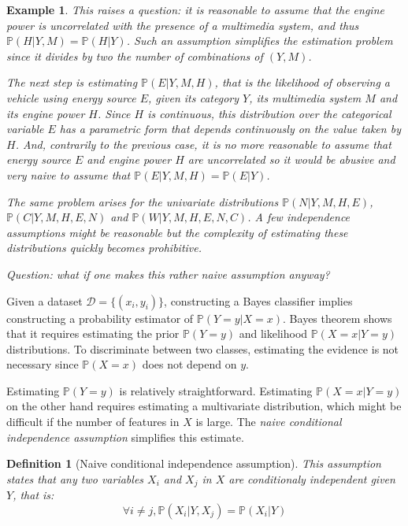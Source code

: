 \documentclass{article}
\newtheorem*{definition}{Definition}
\newtheorem*{example}{Example}
\begin{document}
\begin{example}
This raises a question: it is reasonable to assume that the engine power is uncorrelated with the presence of a multimedia system, and thus $\mathbb{P}(H|Y,M) = \mathbb{P}(H|Y)$. Such an assumption simplifies the estimation problem since it divides by two the number of combinations of $(Y,M)$.

The next step is estimating $\mathbb{P}(E|Y,M,H)$, that is the likelihood of observing a vehicle using energy source $E$, given its category $Y$, its multimedia system $M$ and its engine power $H$. Since $H$ is continuous, this distribution over the categorical variable $E$ has a parametric form that depends continuously on the value taken by $H$. And, contrarily to the previous case, it is no more reasonable to assume that energy source $E$ and engine power $H$ are uncorrelated so it would be abusive and very naive to assume that $\mathbb{P}(E|Y,M,H)=\mathbb{P}(E|Y)$.

The same problem arises for the univariate distributions $\mathbb{P}(N|Y,M,H,E)$, $\mathbb{P}(C|Y,M,H,E,N)$ and $\mathbb{P}(W|Y,M,H,E,N,C)$. A few independence assumptions might be reasonable but the complexity of estimating these distributions quickly becomes prohibitive. 

Question: what if one makes this rather naive assumption anyway?
\end{example}

Given a dataset $\mathcal{D}=\{(x_i,y_i)\}$, constructing a Bayes classifier implies constructing a probability estimator of $\mathbb{P}(Y=y|X=x)$. Bayes theorem shows that it requires estimating the prior $\mathbb{P}(Y=y)$ and likelihood $\mathbb{P}(X=x|Y=y)$ distributions. To discriminate between two classes, estimating the evidence is not necessary since $\mathbb{P}(X=x)$ does not depend on $y$.

Estimating $\mathbb{P}(Y=y)$ is relatively straightforward. Estimating $\mathbb{P}(X=x|Y=y)$ on the other hand requires estimating a multivariate distribution, which might be difficult if the number of features in $X$ is large. The \emph{naive conditional independence assumption} simplifies this estimate.

\begin{definition}[Naive conditional independence assumption]
This assumption states that any two variables $X_i$ and $X_j$ in $X$ are conditionaly independent given $Y$, that is:
\begin{equation*}
\forall i\neq j, \mathbb{P}(X_i|Y, X_j)= \mathbb{P}(X_i|Y)
\end{equation*}
\end{definition}
\end{document}
